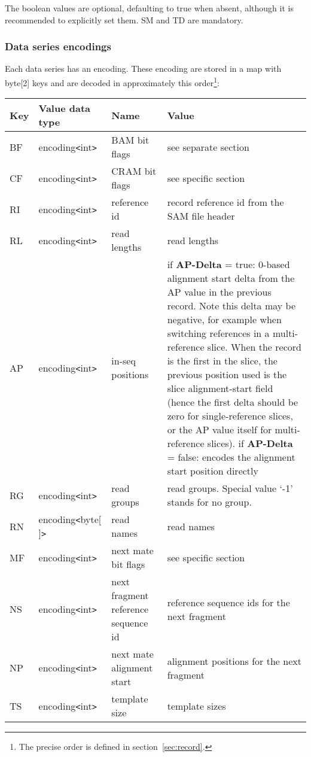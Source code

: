 \documentclass[a4paper]{article}
\begin{document}
The boolean values are optional, defaulting to true when absent, although it is recommended to explicitly set them.  SM and TD are mandatory.

\subsubsection*{Data series encodings}

Each data series has an encoding. These encoding are stored in a map with byte[2] 
keys and are decoded in approximately this order\footnote{The precise order is defined in section~\ref{sec:record}.}:

\begin{threeparttable}[t]
\begin{tabular}{|l|l|>{\raggedright}p{100pt}|>{\raggedright}p{220pt}|}
\hline
\textbf{Key} & \textbf{Value data type} & \textbf{Name} & \textbf{Value}\tabularnewline
\hline
BF & encoding\texttt{<}int\texttt{>} & BAM bit flags & see separate section\tabularnewline
\hline
CF & encoding\texttt{<}int\texttt{>} & CRAM bit flags & see specific section\tabularnewline
\hline
RI & encoding\texttt{<}int\texttt{>} & reference id & record reference id from
the SAM file header\tabularnewline
\hline
RL & encoding\texttt{<}int\texttt{>} & read lengths & read lengths\tabularnewline
\hline
AP & encoding\texttt{<}int\texttt{>} & in-seq positions & if \textbf{AP-Delta} = true: 0-based alignment start
delta from the AP value in the previous record.
Note this delta may be negative, for example when switching references in a multi-reference slice.
When the record is the first in the slice, the previous position used is the slice alignment-start field (hence the first delta should be zero for single-reference slices, or the AP value itself for multi-reference slices).  \linebreak{}
if \textbf{AP-Delta} = false: encodes the alignment start position directly\tabularnewline
\hline
RG & encoding\texttt{<}int\texttt{>} & read groups & read groups. Special value 
`-1' stands for no group.\tabularnewline
\hline
RN\tnote{a} & encoding\texttt{<}byte[ ]\texttt{>} & read names & read names\tabularnewline
\hline
MF & encoding\texttt{<}int\texttt{>} & next mate bit flags & see specific section\tabularnewline
\hline
NS & encoding\texttt{<}int\texttt{>} & next fragment reference sequence id & reference 
sequence ids for the next fragment \tabularnewline
\hline
NP & encoding\texttt{<}int\texttt{>} & next mate alignment start & alignment positions 
for the next fragment\tabularnewline
\hline
TS & encoding\texttt{<}int\texttt{>} & template size & template sizes\tabularnewline

\end{tabular}
\end{threeparttable}
\end{document}
